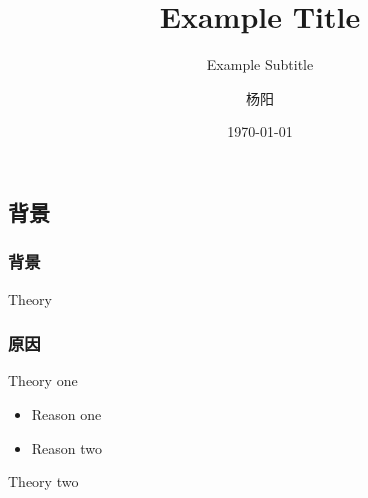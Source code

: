 \documentclass[CJKutf8, 10pt, notes]{beamer}
\title[]{Example Title}
\subtitle{Example Subtitle}
\author{杨阳}
\institute{厦门大学 王亚南经济研究院}
\date{\today}
\begin{document}
\begin{CJK}{UTF8}{gbsn}
\maketitle

\section{背景}

\begin{frame} 
\frametitle{背景}
\begin{alertblock}{Theory}
\lipsum[2]
 \end{alertblock}
\end{frame}


\begin{frame}
\frametitle{原因}
\pause
\begin{alertblock} {Theory one}
 \begin{itemize}
 \pause
 \item Reason one

 \pause
 \item Reason two

 \end{itemize}
 \end{alertblock}
 \pause
 \begin{alertblock}{Theory two}


\end{alertblock}
\end{frame}
\end{CJK}
\end{document}
